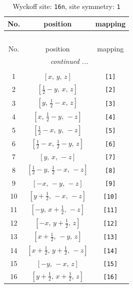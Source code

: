 \documentclass[fleqn,8pt]{jsarticle}
\begin{document}
\begin{longtable}{ccc}
\caption{Wyckoff site: {\tt 16n}, site symmetry: {\tt 1}}
 \\
 \hline \hline
No. & position & mapping \\ \hline \endfirsthead

\multicolumn{2}{l}{\tablename\ \thetable{}} \\
 \hline \hline
No. & position & mapping \\ \hline \endhead

 \hline \hline
\multicolumn{2}{r}{\footnotesize\it continued ...} \\ \endfoot

 \hline \hline
\multicolumn{2}{r}{} \\ \endlastfoot

1 & $\left[ x,\, y,\, z \right]$ & {\tt [1]} \\ \hline
2 & $\left[ \frac{1}{2} - y,\, x,\, z \right]$ & {\tt [2]} \\ \hline
3 & $\left[ y,\, \frac{1}{2} - x,\, z \right]$ & {\tt [3]} \\ \hline
4 & $\left[ x,\, \frac{1}{2} - y,\, - z \right]$ & {\tt [4]} \\ \hline
5 & $\left[ \frac{1}{2} - x,\, y,\, - z \right]$ & {\tt [5]} \\ \hline
6 & $\left[ \frac{1}{2} - x,\, \frac{1}{2} - y,\, z \right]$ & {\tt [6]} \\ \hline
7 & $\left[ y,\, x,\, - z \right]$ & {\tt [7]} \\ \hline
8 & $\left[ \frac{1}{2} - y,\, \frac{1}{2} - x,\, - z \right]$ & {\tt [8]} \\ \hline
9 & $\left[ - x,\, - y,\, - z \right]$ & {\tt [9]} \\ \hline
10 & $\left[ y + \frac{1}{2},\, - x,\, - z \right]$ & {\tt [10]} \\ \hline
11 & $\left[ - y,\, x + \frac{1}{2},\, - z \right]$ & {\tt [11]} \\ \hline
12 & $\left[ - x,\, y + \frac{1}{2},\, z \right]$ & {\tt [12]} \\ \hline
13 & $\left[ x + \frac{1}{2},\, - y,\, z \right]$ & {\tt [13]} \\ \hline
14 & $\left[ x + \frac{1}{2},\, y + \frac{1}{2},\, - z \right]$ & {\tt [14]} \\ \hline
15 & $\left[ - y,\, - x,\, z \right]$ & {\tt [15]} \\ \hline
16 & $\left[ y + \frac{1}{2},\, x + \frac{1}{2},\, z \right]$ & {\tt [16]} \\
\end{longtable}
\end{document}
